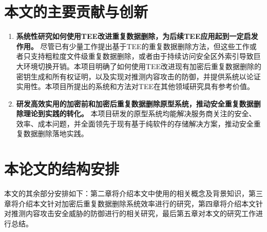 \section{本文的主要贡献与创新}

\begin{enumerate}
    \item \textbf{系统性研究如何使用TEE改进重复数据删除，为后续TEE应用起到一定启发作用。}
    尽管已有少量工作提出基于TEE的重复数据删除方法，但这些工作或者只支持粗粒度文件级重复数据删除\cite{fuhry2020segshare}，或者由于持续访问安全区外索引导致巨大环境切换开销\cite{miranda2021S2Dedup}。本项目明确了如何使用TEE改进现有加密后重复数据删除的密钥生成和所有权证明，以及实现对推测内容攻击的防御，并提供系统以论证实用性。本项目所提出的系统和方法对TEE在其他领域研究具有参考价值。
    \item \textbf{研发高效实用的加密前和加密后重复数据删除原型系统，推动安全重复数据删除理论到实践的转化。}
    本项目研发的原型系统均能解决服务商关注的安全、效率、成本问题，并全面领先于现有基于纯软件的存储解决方案，推动安全重复数据删除落地实践。
\end{enumerate}

\section{本论文的结构安排}

本文的其余部分安排如下：第二章将介绍本文中使用的相关概念及背景知识，第三章将介绍本文针对加密后重复数据删除系统效率进行的研究，第四章将介绍本文针对推测内容攻击安全威胁的防御进行的相关研究，最后第五章对本文的研究工作进行总结。